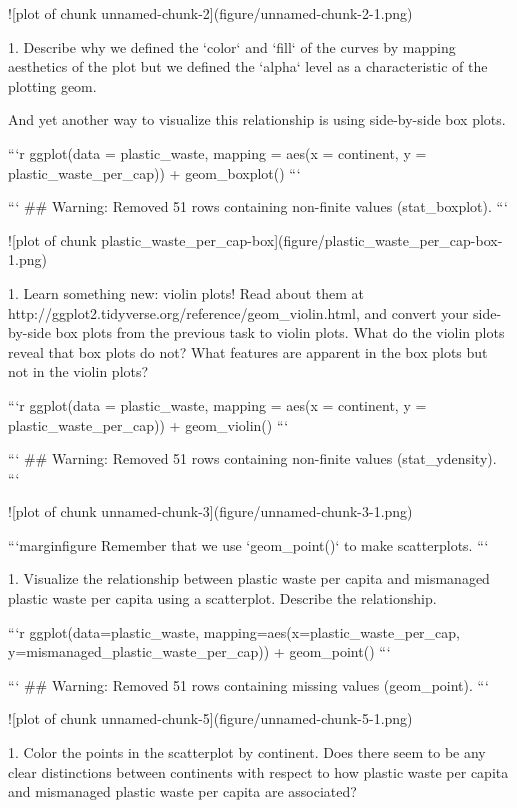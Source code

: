 ![plot of chunk unnamed-chunk-2](figure/unnamed-chunk-2-1.png)


1. Describe why we defined the `color` and `fill` of the curves by mapping aesthetics of the plot but we defined the `alpha` level as a characteristic of the plotting geom.




And yet another way to visualize this relationship is using side-by-side box plots.


```r
ggplot(data = plastic_waste, 
       mapping = aes(x = continent, 
                     y = plastic_waste_per_cap)) +
  geom_boxplot()
```

```
## Warning: Removed 51 rows containing non-finite values (stat_boxplot).
```

![plot of chunk plastic_waste_per_cap-box](figure/plastic_waste_per_cap-box-1.png)

1. Learn something new: violin plots! Read about them at http://ggplot2.tidyverse.org/reference/geom_violin.html, 
and convert your side-by-side box plots from the previous task to violin plots. 
What do the violin plots reveal that box plots do not? What features are 
apparent in the box plots but not in the violin plots?


```r
ggplot(data = plastic_waste, 
       mapping = aes(x = continent, 
                     y = plastic_waste_per_cap)) +
  geom_violin()
```

```
## Warning: Removed 51 rows containing non-finite values (stat_ydensity).
```

![plot of chunk unnamed-chunk-3](figure/unnamed-chunk-3-1.png)



```marginfigure
Remember that we use `geom_point()` to make scatterplots.
```

1. Visualize the relationship between plastic waste per capita and mismanaged plastic waste per capita using a scatterplot. Describe the relationship.


```r
ggplot(data=plastic_waste,
       mapping=aes(x=plastic_waste_per_cap, y=mismanaged_plastic_waste_per_cap)) +
  geom_point()
```

```
## Warning: Removed 51 rows containing missing values (geom_point).
```

![plot of chunk unnamed-chunk-5](figure/unnamed-chunk-5-1.png)

1. Color the points in the scatterplot by continent. Does there seem to be any clear distinctions between continents with respect to how plastic waste per capita and mismanaged plastic waste per capita are associated?


